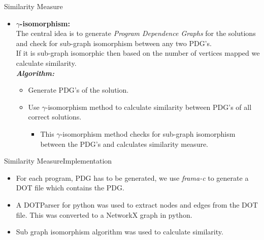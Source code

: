 \documentclass{beamer}
\begin{document}
\begin{frame}{Similarity Measure}
\begin{itemize}
    \item[] \textbf{$\gamma$-isomorphism:}\cite{Liu:2006:GDS:1150402.1150522}\\ 
   The central idea is to generate \textit{Program Dependence Graphs} for the solutions and check for sub-graph isomorphism between any two PDG's.\\
   If it is sub-graph isomorphic then based on the number of vertices mapped we calculate similarity.\\
    
    \textit{\textbf{Algorithm:}}
    \begin{itemize}
    \item Generate PDG's of the solution.
    \item Use $\gamma$-isomorphism method to calculate similarity between PDG's of all correct solutions. 
    \begin{itemize}
        \item This $\gamma$-isomorphism method checks for sub-graph isomorphism between the PDG's and calculates similarity measure.  
    \end{itemize}
    
    \end{itemize} 
\end{itemize}

\end{frame}

\begin{frame}{Similarity Measure}{Implementation}
    \begin{itemize}
        \item For each program, PDG has to be generated, we use \textit{frama-c} to generate a DOT file which contains the PDG.
        \item A DOTParser for python was used to extract nodes and edges from the DOT file. This was converted to a NetworkX graph in python.
        \item Sub graph isomorphism algorithm was used to calculate similarity.
    \end{itemize}
\end{frame}
\end{document}

